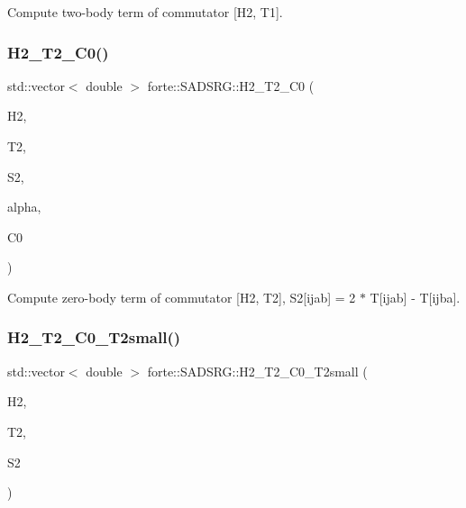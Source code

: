 Compute two-\/body term of commutator \mbox{[}H2, T1\mbox{]}. 

\mbox{\label{classforte_1_1_s_a_d_s_r_g_aeb64dd6b258a9c61e732fa87b06c63da}} 
\subsubsection{\texorpdfstring{H2\+\_\+\+T2\+\_\+\+C0()}{H2\_T2\_C0()}}
{\footnotesize\ttfamily std\+::vector$<$ double $>$ forte\+::\+S\+A\+D\+S\+R\+G\+::\+H2\+\_\+\+T2\+\_\+\+C0 (\begin{DoxyParamCaption}\item[{Blocked\+Tensor \&}]{H2,  }\item[{Blocked\+Tensor \&}]{T2,  }\item[{Blocked\+Tensor \&}]{S2,  }\item[{const double \&}]{alpha,  }\item[{double \&}]{C0 }\end{DoxyParamCaption})\hspace{0.3cm}{\ttfamily [protected]}}



Compute zero-\/body term of commutator \mbox{[}H2, T2\mbox{]}, S2\mbox{[}ijab\mbox{]} = 2 $\ast$ T\mbox{[}ijab\mbox{]} -\/ T\mbox{[}ijba\mbox{]}. 

\mbox{\label{classforte_1_1_s_a_d_s_r_g_af38674aab57174e1f7c09251879e8682}} 
\subsubsection{\texorpdfstring{H2\+\_\+\+T2\+\_\+\+C0\+\_\+\+T2small()}{H2\_T2\_C0\_T2small()}}
{\footnotesize\ttfamily std\+::vector$<$ double $>$ forte\+::\+S\+A\+D\+S\+R\+G\+::\+H2\+\_\+\+T2\+\_\+\+C0\+\_\+\+T2small (\begin{DoxyParamCaption}\item[{Blocked\+Tensor \&}]{H2,  }\item[{Blocked\+Tensor \&}]{T2,  }\item[{Blocked\+Tensor \&}]{S2 }\end{DoxyParamCaption})\hspace{0.3cm}{\ttfamily [protected]}}



